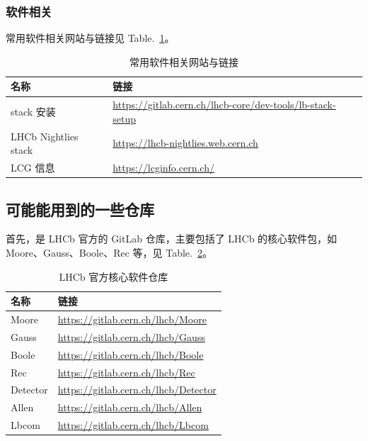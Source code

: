 \documentclass[UTF8]{article}
\begin{document}
\subsubsection{软件相关}
常用软件相关网站与链接见 Table.~\ref{tab:useful-links}。
\begin{table}[htbp]
  \centering
  \caption{常用软件相关网站与链接}
  \label{tab:useful-links}
  \begin{tabular}{ll}
    \toprule
    名称 & 链接 \\
    \midrule
    stack 安装 & \url{https://gitlab.cern.ch/lhcb-core/dev-tools/lb-stack-setup} \\
    LHCb Nightlies stack\footnotemark[1] & \url{https://lhcb-nightlies.web.cern.ch} \\
    LCG 信息\footnotemark[2] & \url{https://lcginfo.cern.ch/} \\
    \bottomrule
  \end{tabular}
\end{table}


\subsection{可能能用到的一些仓库}


首先，是 LHCb 官方的 GitLab 仓库，主要包括了 LHCb 的核心软件包，如 Moore、Gauss、Boole、Rec 等，见 Table.~\ref{tab:stack-repos}。

\begin{table}[htbp]
  \centering
  \caption{LHCb 官方核心软件仓库}
  \label{tab:stack-repos}
  \begin{tabular}{ll}
    \toprule
    名称 & 链接 \\
    \midrule
    Moore & \url{https://gitlab.cern.ch/lhcb/Moore} \\
    Gauss & \url{https://gitlab.cern.ch/lhcb/Gauss} \\
    Boole & \url{https://gitlab.cern.ch/lhcb/Boole} \\
    Rec & \url{https://gitlab.cern.ch/lhcb/Rec} \\
    Detector & \url{https://gitlab.cern.ch/lhcb/Detector} \\
    Allen & \url{https://gitlab.cern.ch/lhcb/Allen} \\
    Lbcom & \url{https://gitlab.cern.ch/lhcb/Lbcom} \\
    \bottomrule
  \end{tabular}
\end{table}
\end{document}
